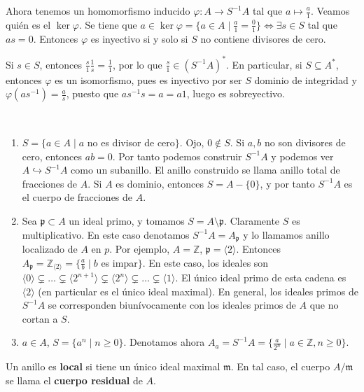 \documentclass[ACGA.tex]{subfiles}
\begin{document}
Ahora tenemos un homomorfismo inducido $\varphi: A\to S^{-1}A$ tal que $a\mapsto \frac{a}{1}$. Veamos quién es el $\ker{\varphi}$. Se tiene que $a\in\ker{\varphi}=\{a\in A\mid \frac{a}{1}=\frac{0}{1}\}\Leftrightarrow \exists s\in S$ tal que $as=0$. Entonces $\varphi$ es inyectivo si y solo si $S$ no contiene divisores de cero.

\begin{observaciones}
Si $s\in S$, entonces $\frac{s}{1}\frac{1}{s}=\frac{1}{1}$, por lo que $\frac{s}{1}\in (S^{-1}A)^*$. En particular, si $S\subseteq A^*$, entonces $\varphi$ es un isomorfismo, pues es inyectivo por ser $S$ dominio de integridad y $\varphi(a s^{-1})=\frac{a}{s}$, puesto que $a s^{-1}s=a=a1$, luego es sobreyectivo.
\end{observaciones}

\begin{ej}\
\begin{enumerate}
\item $S=\{a\in A\mid a$ no es divisor de cero$\}$. Ojo, $0\notin S$. Si $a,b$ no son divisores de cero, entonces $ab=0$. Por tanto podemos construir $S^{-1}A$ y podemos ver $A\hookrightarrow S^{-1}A$ como un subanillo. El anillo construido se llama anillo total de fracciones de $A$.  Si $A$ es dominio, entonces $S=A-\{0\}$, y por tanto $S^{-1}A$ es el cuerpo de fracciones de $A$.
\item Sea $\mathfrak{p}\subset A$ un ideal primo, y tomamos $S=A\setminus\mathfrak{p}$. Claramente $S$ es multiplicativo. En este caso denotamos $S^{-1}A=A_\mathfrak{p}$ y lo llamamos anillo localizado de $A$ en $p$. Por ejemplo, $A=\mathbb{Z}$, $\mathfrak{p}=\langle 2\rangle$. Entonces $A_\mathfrak{p}=\mathbb{Z}_{\langle 2\rangle}=\{\frac{a}{b}\mid b$ es impar$\}$. En este caso, los ideales son $\langle 0\rangle\subsetneq\dots\subsetneq\langle 2^{n+1}\rangle\subsetneq\langle 2^n\rangle\subsetneq\dots\subsetneq\langle 1\rangle$. El único ideal primo de esta cadena es $\langle 2\rangle$ (en particular es el único ideal maximal). En general, los ideales primos de $S^{-1}A$  se corresponden biunívocamente con los ideales primos de $A$ que no cortan a $S$. 
\item $a\in A$, $S=\{a^n\mid n\geq 0\}$. Denotamos ahora $A_a=S^{-1}A=\{\frac{a}{2^n}\mid a\in\mathbb{Z},n\geq 0\}$.
\end{enumerate}

\end{ej}

\begin{defi}
Un anillo es {\bf local } si tiene un único ideal maximal $\mathfrak{m}$. En tal caso, el cuerpo $A/\mathfrak{m}$ se llama el {\bf cuerpo residual } de $A$. 
\end{defi}
\end{document}
